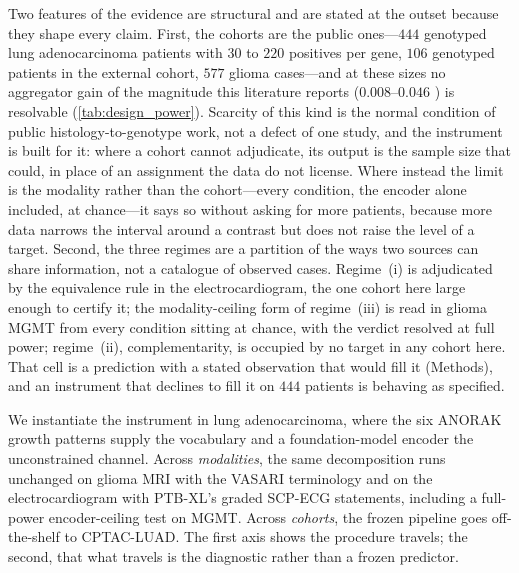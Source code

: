 Two features of the evidence are structural and are stated at the
outset because they shape every claim. First, the cohorts are the public
ones---$444$ genotyped lung adenocarcinoma patients with $30$ to $220$
positives per gene, $106$ genotyped patients in the external cohort,
$577$ glioma cases---and at these sizes no aggregator gain of the
magnitude this literature reports ($0.008$--$0.046$ \auroc{}) is
resolvable (\cref{tab:design_power}). Scarcity of this kind is the
normal condition of public histology-to-genotype work, not a defect of
one study, and the instrument is built for it: where a cohort cannot
adjudicate, its output is the sample size that could, in place of an
assignment the data do not license. Where instead the limit is the
modality rather than the cohort---every condition, the encoder alone
included, at chance---it says so without asking for more patients,
because more data narrows the interval around a contrast but does not
raise the level of a target. Second, the three regimes are a
partition of the ways two sources can share information, not a
catalogue of observed cases. Regime~(i) is adjudicated by the
equivalence rule in the electrocardiogram, the one cohort here large
enough to certify it; the modality-ceiling form of regime~(iii) is read
in glioma MGMT from every condition sitting at chance, with the verdict
resolved at full power; regime~(ii), complementarity, is occupied by
no target in any cohort here. That cell is a prediction with a stated
observation that would fill it (Methods), and an instrument that
declines to fill it on $444$ patients is behaving as specified.

We instantiate the instrument in lung adenocarcinoma, where the six ANORAK
growth patterns\cite{anorak2024} supply the vocabulary and a
foundation-model encoder\cite{wang2022ctranspath} the
unconstrained channel. Across \emph{modalities}, the same decomposition
runs unchanged on glioma MRI with the VASARI
terminology\cite{gutman2013vasari} and on the electrocardiogram with
PTB-XL's graded SCP-ECG statements,\cite{wagner2020ptbxl} including a
full-power encoder-ceiling test on MGMT. Across \emph{cohorts}, the
frozen pipeline goes off-the-shelf to CPTAC-LUAD. The first axis shows
the procedure travels; the second, that what travels is the diagnostic
rather than a frozen predictor.

